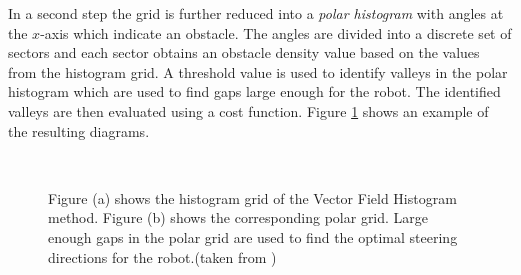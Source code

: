 In a second step the grid is further reduced into a \emph{polar histogram} with angles at the $x$-axis which indicate an obstacle. 
The angles are divided into a discrete set of sectors and each sector obtains an obstacle density value based on the values from the histogram grid.
A threshold value is used to identify valleys in the polar histogram which are used to find gaps large enough for the robot.
The identified valleys are then evaluated using a cost function.
Figure \ref{fig:vfh} shows an example of the resulting diagrams.
\begin{figure}[thpb]
	  \myfloatalign
      \footnotesize
      \centering
    \\
   \caption[Vector Field Histogram.]{Figure (a) shows the histogram grid of the Vector Field Histogram method. Figure (b) shows the corresponding polar grid. Large enough gaps in the polar grid are used to find the optimal steering directions for the robot.(taken from \cite{borenstein1991vector})}
   \label{fig:vfh}
\end{figure}

